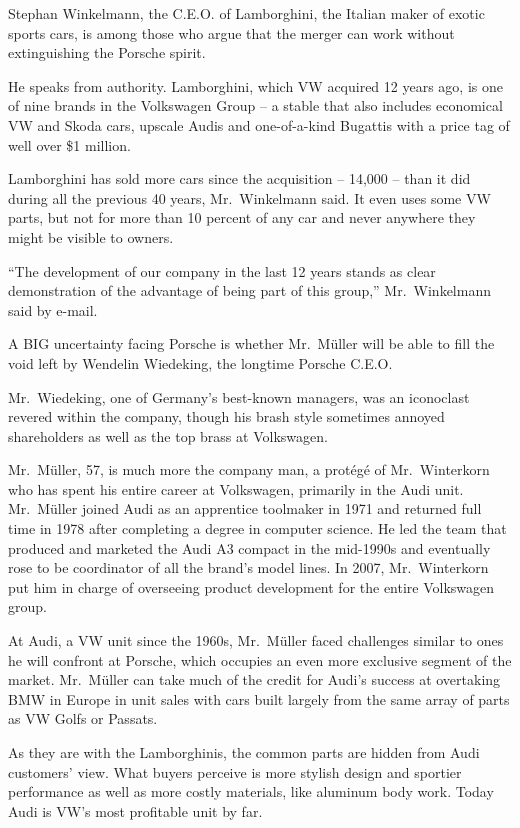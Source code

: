 ﻿\documentclass[12pt]{article}
\begin{document}
Stephan Winkelmann, the C.E.O. of Lamborghini, the Italian maker of exotic sports cars, is among
those who argue that the merger can work without extinguishing the Porsche spirit.

He speaks from authority. Lamborghini, which VW acquired 12 years ago, is one of nine brands in the
Volkswagen Group -- a stable that also includes economical VW and Skoda cars, upscale Audis and
one-of-a-kind Bugattis with a price tag of well over \$1 million.

Lamborghini has sold more cars since the acquisition -- 14,000 -- than it did during all the
previous 40 years, Mr.~Winkelmann said. It even uses some VW parts, but not for more than 10 percent
of any car and never anywhere they might be visible to owners.

``The development of our company in the last 12 years stands as clear demonstration of the advantage
of being part of this group,'' Mr.~Winkelmann said by e-mail.

A BIG uncertainty facing Porsche is whether Mr.~Müller will be able to fill the void left by
Wendelin Wiedeking, the longtime Porsche C.E.O.

Mr.~Wiedeking, one of Germany's best-known managers, was an iconoclast revered within the company,
though his brash style sometimes annoyed shareholders as well as the top brass at Volkswagen.

Mr.~Müller, 57, is much more the company man, a prot\'eg\'e of Mr.~Winterkorn who has spent his
entire career at Volkswagen, primarily in the Audi unit. Mr.~Müller joined Audi as an apprentice
toolmaker in 1971 and returned full time in 1978 after completing a degree in computer science. He
led the team that produced and marketed the Audi A3 compact in the mid-1990s and eventually rose to
be coordinator of all the brand's model lines. In 2007, Mr.~Winterkorn put him in charge of
overseeing product development for the entire Volkswagen group.

At Audi, a VW unit since the 1960s, Mr.~Müller faced challenges similar to ones he will confront at
Porsche, which occupies an even more exclusive segment of the market. Mr.~Müller can take much of
the credit for Audi's success at overtaking BMW in Europe in unit sales with cars built largely from
the same array of parts as VW Golfs or Passats.

As they are with the Lamborghinis, the common parts are hidden from Audi customers' view. What
buyers perceive is more stylish design and sportier performance as well as more costly materials,
like aluminum body work. Today Audi is VW's most profitable unit by far.
\end{document}
